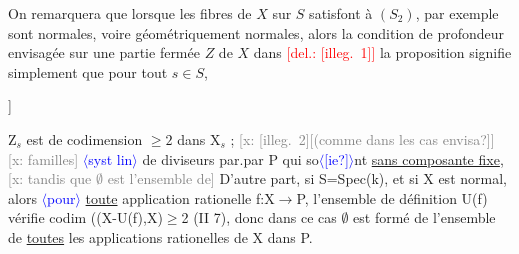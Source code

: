 \documentclass[11pt]{article}
\newcommand{\scanpage}[1]{\par\bigskip\noindent{\small\sffamily[scan #1]}\par}
\newcommand{\mspage}[1]{{\small\sffamily[p.\,#1]}}
\newcommand{\inserted}[2][]{\textcolor{blue}{$\langle$#2$\rangle$}}
\newcommand{\deleted}[1]{\textcolor{red}{[\textsf{del.:} #1]}}
\newcommand{\xout}[1]{\textcolor{gray}{[\textsf{x:} #1]}}
\newcommand{\uline}[1]{\underline{#1}}
\newcommand{\unsure}[1]{[#1?]}
\newcommand{\illegible}[1]{[\textsf{illeg.\ #1}]}
\begin{document}
On remarquera que lorsque  les fibres de $X$ sur $S$ satisfont à $(S_2)$,
par exemple sont normales, voire géométriquement  normales, alors la
condition de profondeur  envisagée sur  une partie fermée $Z$ de $X$ dans \deleted{\illegible{1}}
la proposition  signifie simplement que pour tout $s \in S$,

\mspage{119}

\clearpage
\scanpage{25/120}
\mspage{\unsure{27}}

Z$_s$ est de codimension $\geq 2$ dans X$_s$ ; \xout{\illegible{2}\unsure{(comme dans les cas envisa}}
\xout{familles} \inserted{syst lin} de diviseurs par.par P qui so\inserted{\unsure{ie}}nt
\uline{sans composante fixe}, \xout{tandis que $\emptyset$ est l'ensemble de} D'autre part, si
S=Spec(k), et si X est normal, alors \inserted{pour} \uline{toute} application rationelle
f:X$\to$P, l'ensemble de définition U(f) vérifie codim ((X-U(f),X)$\geq$2
(II 7), donc dans ce cas $\emptyset$ est formé de l'ensemble de \uline{toutes} les
applications rationelles de X dans P.
\end{document}
